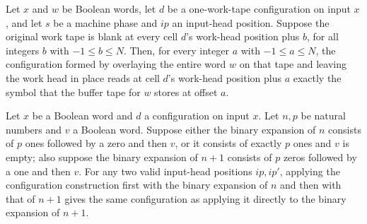 \begin{theorem}
\label{Turing.inputLengthCfg_read}
\leanok
{}
Let $x$ and $w$ be Boolean words, let $d$ be a one-work-tape configuration on input $x$,
and let $s$ be a machine phase and $ip$ an input-head position. Suppose the original
work tape is blank at every cell $d$’s work-head position plus $b$, for all integers $b$
with $-1\le b\le N$. Then, for every integer $a$ with $-1\le a\le N$, the configuration
formed by overlaying the entire word $w$ on that tape and leaving the work head in place
reads at cell $d$’s work-head position plus $a$ exactly the symbol that the buffer tape
for $w$ stores at offset $a$.
\end{theorem}

\begin{theorem}
\label{Turing.inputLengthCfg_merge}
\leanok
{}
Let $x$ be a Boolean word and $d$ a configuration on input $x$. Let $n,p$ be natural
numbers and $v$ a Boolean word. Suppose either the binary expansion of $n$ consists of
$p$ ones followed by a zero and then $v$, or it consists of exactly $p$ ones and $v$ is
empty; also suppose the binary expansion of $n+1$ consists of $p$ zeros followed by a
one and then $v$. For any two valid input-head positions $ip,ip'$, applying the
configuration construction first with the binary expansion of $n$ and then with that of
$n+1$ gives the same configuration as applying it directly to the binary expansion of
$n+1$.
\end{theorem}

